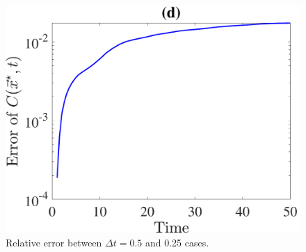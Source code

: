 \begin{figure}[h]
\begin{center}
		\includegraphics[scale=0.35]{./figures/fig_NC10_dt_err_C_star}
	\caption{Relative error between $\Delta t = 0.5$ and 0.25 cases.}
	\label{fig_NC10_dt_err_all}
\end{center}
\end{figure}

